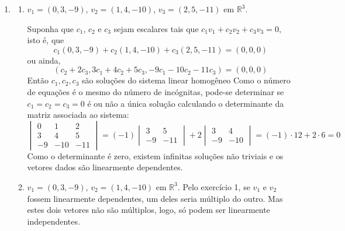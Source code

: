 \documentclass[12pt,a4paper]{article}
\newcommand*\R{\mathbb{R}}
\begin{document}
\begin{enumerate}
\item
\begin{enumerate}
\item $v_1=(0,3,-9)$, $v_2=(1,4,-10)$, $v_3=(2,5,-11)$ em $\R^3$.

Suponha que $c_1$, $c_2$ e $c_3$ sejam escalares tais que $c_1v_1 + c_2v_2 + c_3v_3 = 0$, isto é, que
\[
c_1(0,3,-9) + c_2(1,4,-10) + c_3 (2,5,-11)
= (0, 0, 0)
\]
ou ainda,
\[(c_2 + 2c_3, 3c_1 + 4c_2 + 5c_3, -9c_1 - 10c_2 - 11c_3)
= (0, 0, 0)
\]
Então $c_1, c_2, c_3$ são soluções do sistema linear homogêneo
Como o número de equações é o mesmo do número de incógnitas, pode-se determinar se $c_1=c_2=c_3=0$ é ou não a única solução calculando o determinante da matriz associada ao sistema:
\[
\begin{vmatrix}
 0 &   1 &   2 \\
 3 &   4 &   5 \\
-9 & -10 & -11
\end{vmatrix}
=
(-1)
\begin{vmatrix}
 3 &   5 \\
-9 & -11
\end{vmatrix}
+2
\begin{vmatrix}
 3 &   4 \\
-9 & -10
\end{vmatrix}
=
(-1) \cdot 12
+2 \cdot 6
= 0
\]
Como o determinante é zero, existem infinitas soluções não triviais e os vetores dados  são linearmente dependentes.




\item $v_1=(0,3,-9)$, $v_2=(1,4,-10)$ em $\R^3$.
Pelo exercício 1, se $v_1$ e $v_2$ fossem linearmente dependentes, um deles seria múltiplo do outro. Mas estes dois vetores não são múltiplos, logo, só podem ser linearmente independentes.



\end{enumerate}
\end{enumerate}
\end{document}
